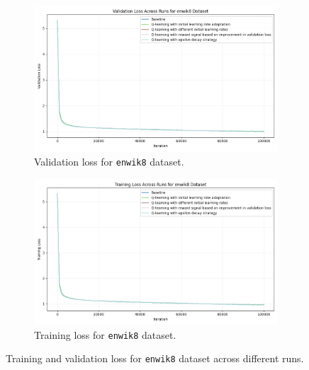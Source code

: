 \documentclass{article} %
\begin{document}
\begin{figure}[h]
    \centering
    \begin{subfigure}{0.49\textwidth}
        \includegraphics[width=\textwidth]{val_loss_enwik8.png}
        \caption{Validation loss for \texttt{enwik8} dataset.}
        \label{fig:val_loss_enwik8}
    \end{subfigure}
    \hfill
    \begin{subfigure}{0.49\textwidth}
        \includegraphics[width=\textwidth]{train_loss_enwik8.png}
        \caption{Training loss for \texttt{enwik8} dataset.}
        \label{fig:train_loss_enwik8}
    \end{subfigure}
    \caption{Training and validation loss for \texttt{enwik8} dataset across different runs.}
    \label{fig:enwik8_loss}
\end{figure}
\end{document}
